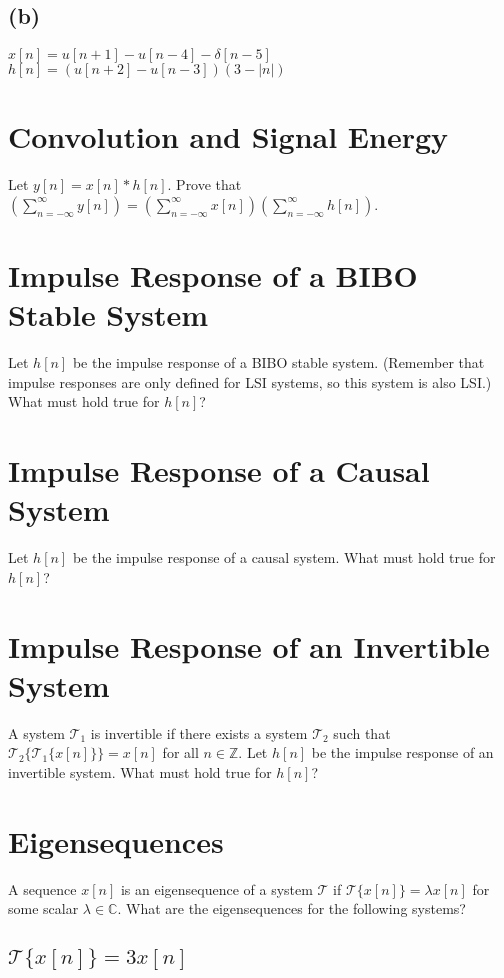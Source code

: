 \documentclass[11pt]{article}
\begin{document}
\subsection*{(b)}
$x[n]=u[n+1]-u[n-4]-\delta[n-5]$
\\
$h[n] = \left(u[n+2]-u[n-3]\right)\left(3-|n|\right)$

\section{Convolution and Signal Energy}
Let $y[n] = x[n]*h[n]$. Prove that $\left( \sum\limits_{n=- \infty }^\infty y[n]\right) = \left(\sum\limits_{n=-\infty}^\infty x[n]\right)\left(\sum\limits_{n=-\infty}^\infty h[n]\right)$.


\section{Impulse Response of a BIBO Stable System}
Let $h[n]$ be the impulse response of a BIBO stable system. (Remember that impulse responses are only defined for LSI systems, so this system is also LSI.) What must hold true for $h[n]$?

\section{Impulse Response of a Causal System}
Let $h[n]$ be the impulse response of a causal system. What must hold true for $h[n]$?

\section{Impulse Response of an Invertible System}
A system $\mathcal{T}_1$ is invertible if there exists a system $\mathcal{T}_2$ such that $\mathcal{T}_2\{\mathcal{T}_1\{x[n]\}\} = x[n]$ for all $n \in \mathbb{Z}$. Let $h[n]$ be the impulse response of an invertible system. What must hold true for $h[n]$?

\section{Eigensequences}
A sequence $x[n]$ is an eigensequence of a system $\mathcal{T}$ if $\mathcal{T}\{x[n]\}=\lambda x[n]$ for some scalar $\lambda \in \mathbb{C}$. What are the eigensequences for the following systems?
\subsection{$\mathcal{T}\{x[n]\}=3x[n]$}
\end{document}
